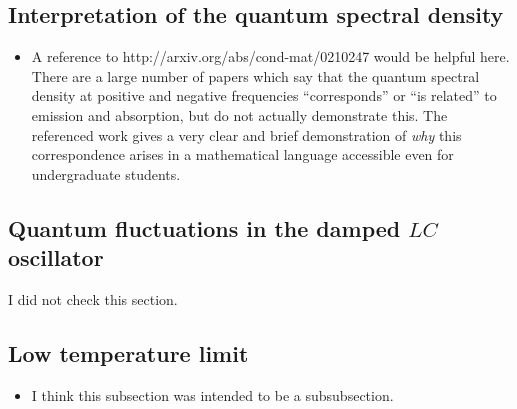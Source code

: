\subsection{Interpretation of the quantum spectral density}

\begin{itemize}

\item A reference to http://arxiv.org/abs/cond-mat/0210247 would be helpful here. There are a large number of papers which say that the quantum spectral density at positive and negative frequencies ``corresponds'' or ``is related'' to emission and absorption, but do not actually demonstrate this. The referenced work gives a very clear and brief demonstration of \emph{why} this correspondence arises in a mathematical language accessible even for undergraduate students.

\end{itemize}

\subsection{Quantum fluctuations in the damped $LC$ oscillator}

I did not check this section.

\subsection{Low temperature limit}

\begin{itemize}

\item I think this subsection was intended to be a subsubsection.

\end{itemize}

